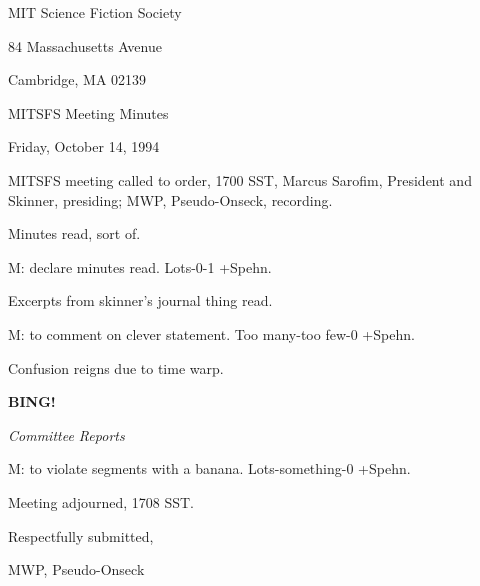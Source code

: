\documentclass[12pt]{article}
\newcommand{\bing}{{\bf BING!} }
\newcommand{\goto}[1]{\bing \vskip 12pt \centerline{{\em{#1}}}}
\begin{document}
\begin{center}

MIT Science Fiction Society 

84 Massachusetts Avenue

Cambridge, MA 02139

\vspace{12pt}

MITSFS Meeting Minutes 

Friday, October 14, 1994

\end{center}
 
\vspace{18pt}

\setlength{\parskip}{6pt}

\noindent
MITSFS meeting called to order, 1700 SST,
Marcus Sarofim, President and Skinner, presiding; MWP, Pseudo-Onseck, recording.

Minutes read, sort of.

M: declare minutes read. Lots-0-1 +Spehn.

Excerpts from skinner's journal thing read.

M: to comment on clever statement. Too many-too few-0 +Spehn.

Confusion reigns due to time warp.

\goto{Committee Reports}

M: to violate segments with a banana. Lots-something-0 +Spehn.

\vspace{12pt}

\noindent
Meeting adjourned, 1708 SST.

\vspace{18pt}

\centerline{Respectfully submitted,}
\centerline{MWP, Pseudo-Onseck}
\end{document}
